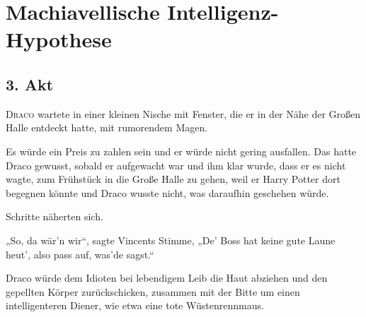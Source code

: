 \chapter{Machiavellische Intelligenz-Hypothese}


\section{3. Akt}

\lettrine{D}{raco} wartete in einer kleinen Nische mit Fenster, die er in der Nähe der Großen Halle entdeckt hatte, mit rumorendem Magen.

Es würde ein Preis zu zahlen sein und er würde nicht gering ausfallen. Das hatte Draco gewusst, sobald er aufgewacht war und ihm klar wurde, dass er es nicht wagte, zum Frühstück in die Große Halle zu gehen, weil er Harry Potter dort begegnen könnte und Draco wusste nicht, was daraufhin geschehen würde.

Schritte näherten sich.

„So, da wär’n wir“, sagte Vincents Stimme, „De’ Boss hat keine gute Laune heut’, also pass auf, was’de sagst.“

Draco würde dem Idioten bei lebendigem Leib die Haut abziehen und den gepellten Körper zurückschicken, zusammen mit der Bitte um einen intelligenteren Diener, wie etwa eine tote Wüstenrennmaus.

